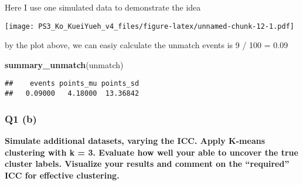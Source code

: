 \documentclass[]{article}
\newenvironment{Shaded}{\begin{snugshade}}{\end{snugshade}}
\newcommand{\KeywordTok}[1]{\textcolor[rgb]{0.13,0.29,0.53}{\textbf{#1}}}
\newcommand{\DataTypeTok}[1]{\textcolor[rgb]{0.13,0.29,0.53}{#1}}
\newcommand{\DecValTok}[1]{\textcolor[rgb]{0.00,0.00,0.81}{#1}}
\newcommand{\FloatTok}[1]{\textcolor[rgb]{0.00,0.00,0.81}{#1}}
\newcommand{\StringTok}[1]{\textcolor[rgb]{0.31,0.60,0.02}{#1}}
\newcommand{\OperatorTok}[1]{\textcolor[rgb]{0.81,0.36,0.00}{\textbf{#1}}}
\newcommand{\NormalTok}[1]{#1}
\begin{document}
Here I use one simulated data to demonstrate the idea

\begin{Shaded}
\end{Shaded}

\texttt{[image: PS3\_Ko\_KueiYueh\_v4\_files/figure-latex/unnamed-chunk-12-1.pdf]}

by the plot above, we can easiy calculate the unmatch events is 9 / 100
= 0.09

\begin{Shaded}
\begin{Highlighting}[]
\KeywordTok{summary_unmatch}\NormalTok{(unmatch)}
\end{Highlighting}
\end{Shaded}

\begin{verbatim}
##    events points_mu points_sd 
##   0.09000   4.18000  13.36842
\end{verbatim}

\subsubsection{Q1 (b)}\label{q1-b}

\textbf{Simulate additional datasets, varying the ICC. Apply K-means
clustering with k = 3. Evaluate how well your able to uncover the true
cluster labels. Visualize your results and comment on the ``required''
ICC for effective clustering.}
\end{document}
